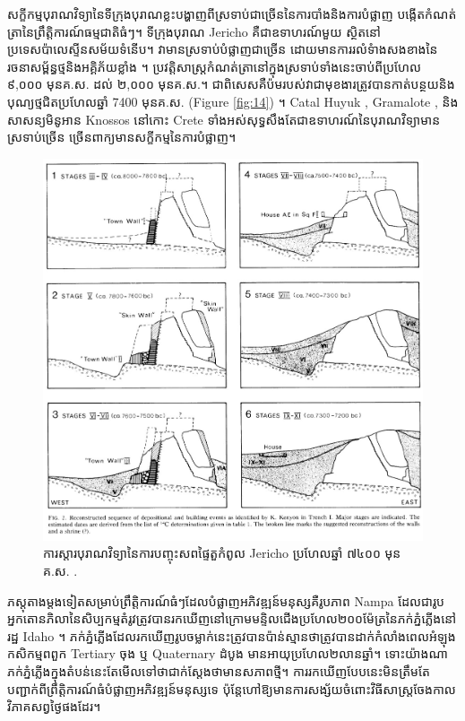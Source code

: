 \documentclass[10pt,twocolumn,letterpaper]{article}
\begin{document}
សក្ខីកម្មបុរាណវិទ្យានៃទីក្រុងបុរាណខ្លះបង្ហាញពីស្រទាប់ជាច្រើននៃការបាំងនិងការបំផ្លាញ បង្កើតកំណត់ត្រានៃព្រឹត្តិការណ៍ធម្មជាតិធំៗ។ ទីក្រុងបុរាណ Jericho គឺជាឧទាហរណ៍មួយ ស្ថិតនៅប្រទេសប៉ាលេស្ទីនសម័យទំនើប។ វាមានស្រទាប់បំផ្លាញជាច្រើន ដោយមានការរលំទំាងសងខាងនៃរចនាសម្ព័ន្ធថ្មនិងអគ្គិភ័យខ្លាំង \cite{96,97}។ ប្រវត្តិសាស្ត្រកំណត់ត្រានៅក្នុងស្រទាប់ទាំងនេះចាប់ពីប្រហែល ៩,០០០ មុនគ.ស. ដល់ ២,០០០ មុនគ.ស.។ ជាពិសេសគឺប៉មរបស់វាជាមុខងារត្រូវបានកាត់បន្ថយនិងបុណ្យថ្មជិតប្រហែលឆ្នាំ 7400 មុនគ.ស. (Figure \ref{fig:14}) \cite{95}។ Catal Huyuk \cite{99}, Gramalote \cite{98}, និងសាសន្យមិនូអាន Knossos នៅកោះ Crete \cite{100,101} ទាំងអស់សុទ្ធសឹងតែជាឧទាហរណ៍នៃបុរាណវិទ្យាមានស្រទាប់ច្រើន ច្រើនពាក្យមានសក្ខីកម្មនៃការបំផ្លាញ។

\begin{figure}[t]
\begin{center}

   \includegraphics[width=1\linewidth]{jericho.jpg}
\end{center}
   \caption{ការស្តារ​បុរាណវិទ្យា​នៃ​ការ​បញ្ចុះ​សព​ផ្ទៃតួកំពូល Jericho ប្រហែលឆ្នាំ ៧៤០០ មុន​គ.ស. \cite{95}.}
\label{fig:14}
\label{fig:onecol}
\end{figure}

ភស្តុតាងម្ដងទៀតសម្រាប់ព្រឹត្តិការណ៍ធំៗដែលបំផ្លាញអភិវឌ្ឍន៍មនុស្សគឺ​រូបភាព Nampa ដែលជារូបអ្នកតោនភិលានៃសិប្បកម្មតំរូវត្រូវបានរកឃើញនៅក្រោមមន្ទិលជើងប្រហែល២០០ម៉ែត្រនៃភក់ភ្នំភ្លើង​នៅ​រដ្ឋ Idaho \cite{102,103}។ ភក់ភ្នំភ្លើងដែលរកឃើញរូបចម្លាក់នេះត្រូវបានប៉ាន់ស្មានថាត្រូវបានដាក់កំលាំងពេលអំឡុងកសិកម្មពពួក Tertiary ចុង ឬ Quaternary ដំបូង មានអាយុប្រហែល២លានឆ្នាំ។ ទោះយ៉ាងណា ភក់ភ្នំភ្លើងក្នុងតំបន់នេះតែមើលទៅថាជាក់ស្តែងថាមានសភាពថ្មី។ ការរកឃើញបែបនេះមិនត្រឹមតែបញ្ជាក់ពីព្រឹត្តិការណ៍ធំបំផ្លាញអភិវឌ្ឍន៍មនុស្សទេ ប៉ុន្ដែហៅឱ្យមានការសង្ស័យចំពោះវិធីសាស្ត្រចែងកាលវិភាគសព្វថ្ងៃផងដែរ។
\end{document}

